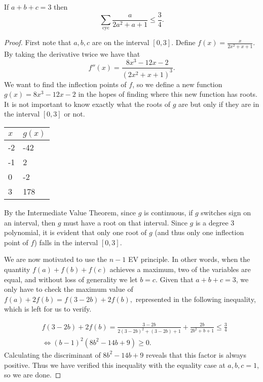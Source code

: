\documentclass[letterpaper,oneside]{scrartcl}
\begin{document}
\newpage
\begin{problem*}
  If \(a+b+c=3\) then 
  \[\sum_{\text{cyc}} \frac{a}{2a^2+a+1} \leq \frac34.\]
\end{problem*}
\begin{proof}
  First note that \(a,b,c\) are on the interval \([0,3]\). 
  Define \(f(x) = \frac{x}{2x^2+x+1}.\) By taking the derivative twice we have that 
  \[f''(x) = \frac{8x^3-12x-2}{\left(2x^2+x+1\right)^3}.\]
  We want to find the inflection points of \(f\), so we define a new function 
  \(g(x) = 8x^3-12x-2\) in the hopes of finding where this new function has roots. It is not important to know exactly what the roots of \(g\) are but only if they are in the interval \([0,3]\) or not.

  \begin{table}[ht]
    \centering
    \begin{tabular}{|l|l|}
    \hline
    $x$ & $g(x)$ \\ \hline
    -2  & -42    \\ \hline
    -1  & 2      \\ \hline
    0   & -2     \\ \hline
    3   & 178    \\ \hline
    \end{tabular}
    \end{table}
  By the Intermediate Value Theorem, since \(g\) is continuous, if \(g\) switches sign on an interval, then \(g\) must have a root on that interval. Since \(g\) is a degree 3 polynomial, it is evident that only one root of \(g\) (and thus only one inflection point of \(f\)) falls in the interval \([0,3].\)

  We are now motivated to use the \(n-1\) EV principle. In other words, when the quantity \(f(a)+f(b)+f(c)\) achieves a maximum, two of the variables are equal, and without loss of generality we let \(b=c\). Given that \(a+b+c=3\), we only have to check the maximum value of \(f(a)+2f(b) = f(3-2b) + 2f(b),\) represented in the following inequality, which is left for us to verify.

  \begin{align*}
    &f(3-2b)+2f(b) = \frac{3-2b}{2(3-2b)^2+(3-2b)+1} + \frac{2b}{2b^2+b+1} \leq \frac34 \\
    &\Longleftrightarrow (b-1)^2(8b^2-14b+9) \geq 0.
  \end{align*}
  Calculating the discriminant of \(8b^2-14b+9\) reveals that this factor is always positive. Thus we have verified this inequality with the equality case at \(a,b,c=1\), so we are done. 
\end{proof}
\end{document}
